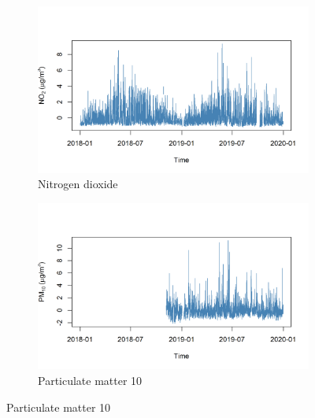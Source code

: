 \documentclass[a4paper, 10pt]{article}
\begin{document}
\begin{flushleft}
      \begin{figure}[H]
         \centering
         \begin{subfigure}{0.48\linewidth}
            \centering
            \includegraphics[width=\linewidth]{../img/scaled_no2.png}
         \caption{Nitrogen dioxide}
         \end{subfigure}
         \hfill
         \begin{subfigure}{0.48\linewidth}
            \centering
            \includegraphics[width=\linewidth]{../img/scaled_pm10.png}
            \caption{Particulate matter 10}
         \end{subfigure}
         
         \vspace{0.5em}


\end{figure}
\end{flushleft}
\end{document}
